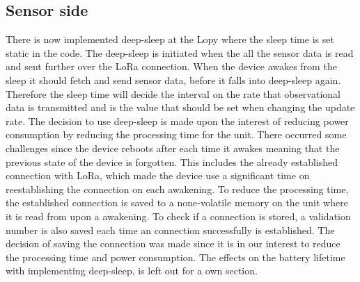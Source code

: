 	\subsection{Sensor side}
		There is now implemented deep-sleep at the Lopy where the sleep time is set static in the code. The deep-sleep is initiated when the all the sensor data is read and sent further over the LoRa connection. When the device awakes from the sleep it should fetch and send sensor data, before it falls into deep-sleep again. Therefore the sleep time will decide the interval on the rate that observational data is transmitted and is the value that should be set when changing the update rate. The decision to use deep-sleep is made upon the interest of reducing power consumption by reducing the processing time for the unit. There occurred some challenges since the device reboots after each time it awakes meaning that the previous state of the device is forgotten. This includes the already established connection with LoRa, which made the device use a significant time on reestablishing the connection on each awakening. To reduce the processing time, the established connection is saved to a none-volatile memory on the unit where it is read from upon a awakening. To check if a connection is stored, a validation number is also saved each time an connection successfully is established. The decision of saving the connection was made since it is in our interest to reduce the processing time and power consumption. The effects on the battery lifetime with implementing deep-sleep, is left out for a own section. \\\\ 
	
